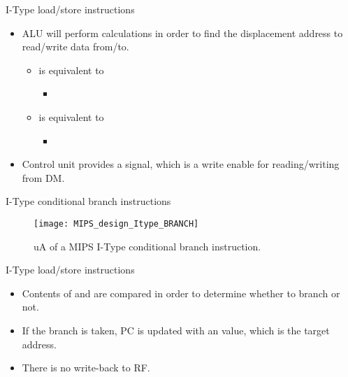 \documentclass[]{slides}
\begin{document}
% 
\begin{frame}{I-Type load/store instructions}
\begin{itemize}
\item \ac{ALU} will perform calculations in order to find the displacement address to read/write data from/to.
\begin{itemize}
\item {} is equivalent to
\begin{itemize}
\item[] 
\end{itemize} 
\item[]  is equivalent to 
\begin{itemize}
\item[] 
\end{itemize}
\end{itemize}
\item Control unit provides a  signal, which is a write enable for reading/writing from \ac{DM}.
\end{itemize}
\end{frame}

% 
\begin{frame}{I-Type conditional branch instructions}
  \begin{figure}
  \centering
  \texttt{[image: MIPS\_design\_Itype\_BRANCH]}
  \vspace{-3pt}
  \caption{\ac{uA} of a \ac{MIPS} I-Type conditional branch instruction.}
  \label{Figure:non_pipelined_MIPS_Itype_BRANCH}
  \end{figure}
\end{frame}

%
\begin{frame}{I-Type load/store instructions}
\begin{itemize}
\item Contents of  and  are compared in order to determine whether to branch or not.
\item If the branch is taken, \ac{PC} is updated with an  value, which is the target address.
\item There is no write-back to \ac{RF}.
\end{itemize}
\end{frame}
\end{document}

